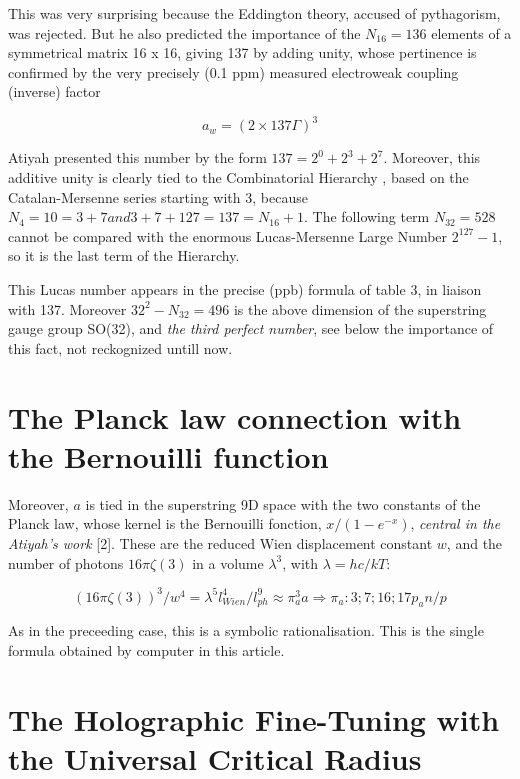 \documentclass[a4paper,9pt]{article}
\begin{document}
 This was very surprising because the Eddington theory, accused of pythagorism, was rejected. But he also predicted the importance of the $N_16 = 136$ elements of a symmetrical matrix 16 x 16, giving 137 by adding unity, whose pertinence is confirmed by the very precisely (0.1 ppm) measured electroweak coupling (inverse) factor 

\begin{equation}
a_w = (2\times137 \Gamma)^3
\end{equation}
 
Atiyah presented this number by the form $137 = 2^0 + 2^3 + 2^7$. Moreover, this additive unity is clearly tied to the Combinatorial Hierarchy \cite{Bastin}, based on the Catalan-Mersenne series starting with 3, because $N_4 = 10 = 3 + 7 and 3+7 + 127 = 137 = N_16 + 1$. The following term $N_32  = 528$ cannot be compared with the enormous Lucas-Mersenne Large Number $2^{127}- 1$, so it is the last term of the Hierarchy. 

This Lucas number appears in the precise (ppb) formula of table 3, in liaison with 137. Moreover $32^2 - N_32 =  496$ is the above dimension of the superstring gauge group SO(32), and \textit {the third perfect number}, see below the importance of this fact, not reckognized untill now.




\section{The Planck law connection with the Bernouilli function}

 Moreover, $a$ is tied in the superstring 9D space with the two constants of the Planck law, whose kernel is the Bernouilli fonction, $x/(1-e^{-x})$, \textit {central in the Atiyah's work} [2]. These are the reduced Wien displacement constant $w$, and the number of photons $16\pi \zeta(3)$ in a volume $\lambda^3$, with $\lambda = hc/kT $:

\begin{equation}
(16\pi\zeta(3))^3/w^4 = \lambda^5l_{Wien}^4/l_{ph}^9 \approx \pi_a^3a    \Rightarrow     \pi_a: 3;7;16;17p_an/p
\end{equation}

As in the preceeding case, this is a symbolic rationalisation. This is the single formula obtained by computer in this article.


\section{The Holographic Fine-Tuning with the Universal Critical Radius}
\end{document}

